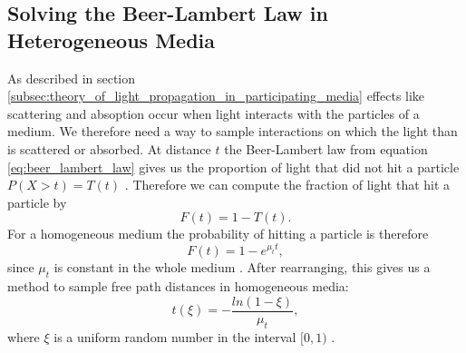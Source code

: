 \subsection{Solving the Beer-Lambert Law in Heterogeneous Media}
\label{subsec:solving_beer_lambert_law_in_heterogeneous_media}
As described in section \ref{subsec:theory_of_light_propagation_in_participating_media} effects like scattering and absoption occur when light interacts with the particles of a medium.
We therefore need a way to sample interactions on which the light than is scattered or absorbed.
At distance $t$ the Beer-Lambert law from equation \ref{eq:beer_lambert_law} gives us the proportion of light that did not hit a particle $P(X > t) = T(t)$ \cite{novak_overview}.
Therefore we can compute the fraction of light that hit a particle by \cite{novak_overview}
\begin{equation*}
    F(t) = 1 - T(t).
\end{equation*}
For a homogeneous medium the probability of hitting a particle is therefore
\begin{equation*}
    F(t) = 1 - e^{\mu_t t},
\end{equation*}
since $\mu_t$ is constant in the whole medium \cite{novak_overview}.
After rearranging, this gives us a method to sample free path distances in homogeneous media:
\begin{equation}
    \label{eq:distance_sampling}
    t(\xi) = -\frac{ln(1-\xi)}{\mu_t},
\end{equation}
where $\xi$ is a uniform random number in the interval $[0, 1)$ \cite{novak_overview}.

